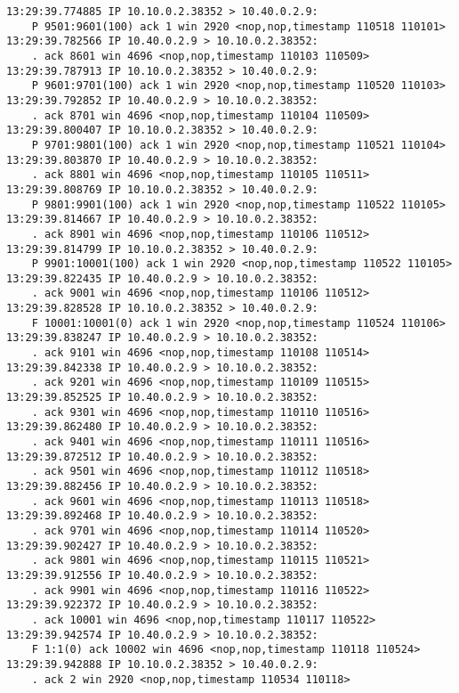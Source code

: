 \documentclass[a4paper,12pt]{article}
\begin{document}
\begin{Verbatim}
13:29:39.774885 IP 10.10.0.2.38352 > 10.40.0.2.9: 
    P 9501:9601(100) ack 1 win 2920 <nop,nop,timestamp 110518 110101>
13:29:39.782566 IP 10.40.0.2.9 > 10.10.0.2.38352: 
    . ack 8601 win 4696 <nop,nop,timestamp 110103 110509>
13:29:39.787913 IP 10.10.0.2.38352 > 10.40.0.2.9: 
    P 9601:9701(100) ack 1 win 2920 <nop,nop,timestamp 110520 110103>
13:29:39.792852 IP 10.40.0.2.9 > 10.10.0.2.38352: 
    . ack 8701 win 4696 <nop,nop,timestamp 110104 110509>
13:29:39.800407 IP 10.10.0.2.38352 > 10.40.0.2.9: 
    P 9701:9801(100) ack 1 win 2920 <nop,nop,timestamp 110521 110104>
13:29:39.803870 IP 10.40.0.2.9 > 10.10.0.2.38352: 
    . ack 8801 win 4696 <nop,nop,timestamp 110105 110511>
13:29:39.808769 IP 10.10.0.2.38352 > 10.40.0.2.9: 
    P 9801:9901(100) ack 1 win 2920 <nop,nop,timestamp 110522 110105>
13:29:39.814667 IP 10.40.0.2.9 > 10.10.0.2.38352: 
    . ack 8901 win 4696 <nop,nop,timestamp 110106 110512>
13:29:39.814799 IP 10.10.0.2.38352 > 10.40.0.2.9: 
    P 9901:10001(100) ack 1 win 2920 <nop,nop,timestamp 110522 110105>
13:29:39.822435 IP 10.40.0.2.9 > 10.10.0.2.38352: 
    . ack 9001 win 4696 <nop,nop,timestamp 110106 110512>
13:29:39.828528 IP 10.10.0.2.38352 > 10.40.0.2.9: 
    F 10001:10001(0) ack 1 win 2920 <nop,nop,timestamp 110524 110106>
13:29:39.838247 IP 10.40.0.2.9 > 10.10.0.2.38352: 
    . ack 9101 win 4696 <nop,nop,timestamp 110108 110514>
13:29:39.842338 IP 10.40.0.2.9 > 10.10.0.2.38352: 
    . ack 9201 win 4696 <nop,nop,timestamp 110109 110515>
13:29:39.852525 IP 10.40.0.2.9 > 10.10.0.2.38352: 
    . ack 9301 win 4696 <nop,nop,timestamp 110110 110516>
13:29:39.862480 IP 10.40.0.2.9 > 10.10.0.2.38352: 
    . ack 9401 win 4696 <nop,nop,timestamp 110111 110516>
13:29:39.872512 IP 10.40.0.2.9 > 10.10.0.2.38352: 
    . ack 9501 win 4696 <nop,nop,timestamp 110112 110518>
13:29:39.882456 IP 10.40.0.2.9 > 10.10.0.2.38352: 
    . ack 9601 win 4696 <nop,nop,timestamp 110113 110518>
13:29:39.892468 IP 10.40.0.2.9 > 10.10.0.2.38352: 
    . ack 9701 win 4696 <nop,nop,timestamp 110114 110520>
13:29:39.902427 IP 10.40.0.2.9 > 10.10.0.2.38352: 
    . ack 9801 win 4696 <nop,nop,timestamp 110115 110521>
13:29:39.912556 IP 10.40.0.2.9 > 10.10.0.2.38352: 
    . ack 9901 win 4696 <nop,nop,timestamp 110116 110522>
13:29:39.922372 IP 10.40.0.2.9 > 10.10.0.2.38352: 
    . ack 10001 win 4696 <nop,nop,timestamp 110117 110522>
13:29:39.942574 IP 10.40.0.2.9 > 10.10.0.2.38352: 
    F 1:1(0) ack 10002 win 4696 <nop,nop,timestamp 110118 110524>
13:29:39.942888 IP 10.10.0.2.38352 > 10.40.0.2.9: 
    . ack 2 win 2920 <nop,nop,timestamp 110534 110118>
\end{Verbatim}
\end{document}
